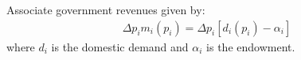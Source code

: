 Associate government revenues given by:
\begin{gather*}
     \Delta p_i m_i(p_i) = \Delta p_i [d_i(p_i) - \alpha_i]
\end{gather*}
where $d_i$ is the domestic demand and $\alpha_i$ is the endowment.

